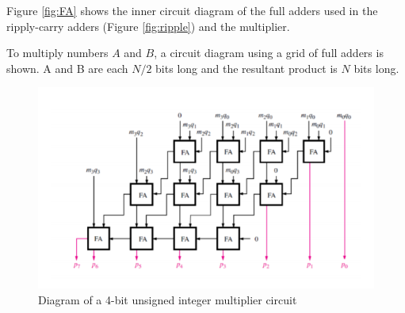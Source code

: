\documentclass[11pt]{article}
\begin{document}
	Figure \ref{fig:FA} shows the inner circuit diagram of the full adders used in
	the ripply-carry adders (Figure \ref{fig:ripple}) and the multiplier.
	
	\pagebreak
	
	To multiply numbers $A$ and $B$, a circuit diagram using a grid of full
	adders is shown. A and B are each $N/2$ bits long and the resultant product
	is $N$ bits long.
	
	\begin{figure}[h!]
        \centering
        \includegraphics[width=\textwidth]{multiplier}
        \caption{Diagram of a 4-bit unsigned integer multiplier circuit}
        \label{fig:demo6}
    \end{figure}
\end{document}
